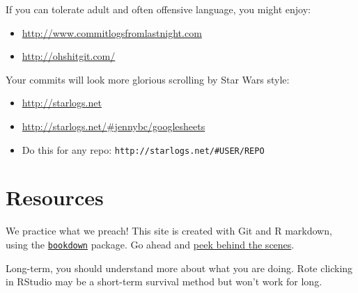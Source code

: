 \documentclass[
]{book}
\providecommand{\tightlist}{%
  \setlength{\itemsep}{0pt}\setlength{\parskip}{0pt}}
\begin{document}
If you can tolerate adult and often offensive language, you might enjoy:

\begin{itemize}
\tightlist
\item
  \url{http://www.commitlogsfromlastnight.com}
\item
  \url{http://ohshitgit.com/}
\end{itemize}

Your commits will look more glorious scrolling by Star Wars style:

\begin{itemize}
\tightlist
\item
  \url{http://starlogs.net}
\item
  \url{http://starlogs.net/\#jennybc/googlesheets}
\item
  Do this for any repo: \texttt{http://starlogs.net/\#USER/REPO}
\end{itemize}

\chapter{Resources}\label{resources}

We practice what we preach! This site is created with Git and R markdown, using the \href{https://github.com/rstudio/bookdown/}{\texttt{bookdown}} package. Go ahead and \href{https://github.com/jennybc/happy-git-with-r}{peek behind the scenes}.

Long-term, you should understand more about what you are doing. Rote clicking in RStudio may be a short-term survival method but won't work for long.
\end{document}
